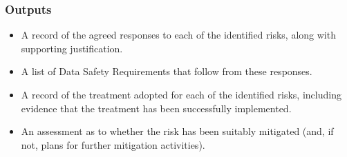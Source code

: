 \subsubsection{Outputs}
\begin{itemize}
	\item A record of the agreed responses to each of the identified risks, along with supporting justification.
	\item A list of Data Safety Requirements that follow from these responses.
	\item A record of the treatment adopted for each of the identified risks, including evidence that the treatment has been successfully implemented.
	\item An assessment as to whether the risk has been suitably mitigated (and, if not, plans for further mitigation activities).
\end{itemize}
